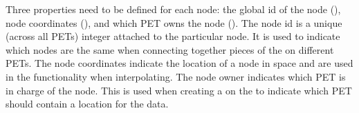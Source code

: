 \documentclass[letterpaper,10pt,english]{sphinxmanual}
\begin{document}
Three properties need to be defined for each {\hyperref[\detokenize{mesh:ESMF.api.mesh.Mesh}]{}} node: the global id of the node
(), node coordinates (), and which PET owns the node
(). The node id is a unique (across all PETs) integer attached
to the particular node. It is used to indicate which nodes are the same when
connecting together pieces of the {\hyperref[\detokenize{mesh:ESMF.api.mesh.Mesh}]{}} on different PETs. The node
coordinates indicate the location of a node in space and are used in the {\hyperref[\detokenize{regrid:ESMF.api.regrid.Regrid}]{}}
functionality when interpolating. The node owner indicates which PET is in
charge of the node. This is used when creating a {\hyperref[\detokenize{field:ESMF.api.field.Field}]{}} on the {\hyperref[\detokenize{mesh:ESMF.api.mesh.Mesh}]{}} to indicate
which PET should contain a {\hyperref[\detokenize{field:ESMF.api.field.Field}]{}} location for the data.
\end{document}
